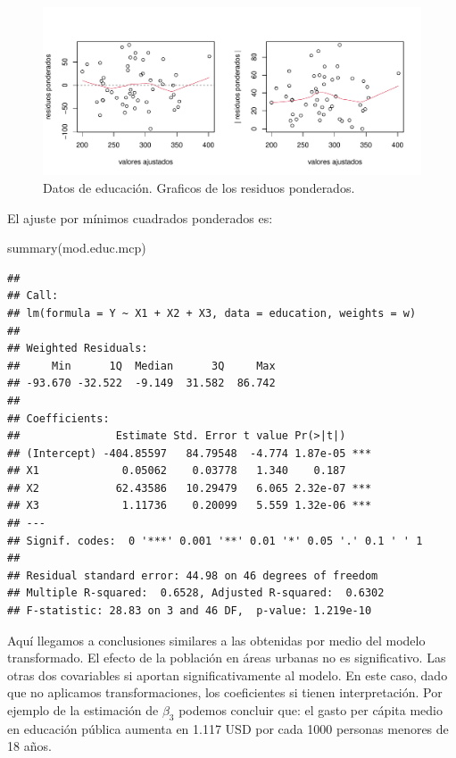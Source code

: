 \documentclass[
]{article}
\newenvironment{Shaded}{\begin{snugshade}}{\end{snugshade}}
\newcommand{\FunctionTok}[1]{\textcolor[rgb]{0.00,0.00,0.00}{#1}}
\newcommand{\NormalTok}[1]{#1}
\begin{document}
\begin{figure}

{\centering \includegraphics{MLGI_files/figure-latex/EducMCPFig-1} 

}

\caption{Datos de educación. Graficos de los residuos ponderados.}\label{fig:EducMCPFig}
\end{figure}

El ajuste por mínimos cuadrados ponderados es:

\begin{Shaded}
\begin{Highlighting}[]
\FunctionTok{summary}\NormalTok{(mod.educ.mcp)}
\end{Highlighting}
\end{Shaded}

\begin{verbatim}
## 
## Call:
## lm(formula = Y ~ X1 + X2 + X3, data = education, weights = w)
## 
## Weighted Residuals:
##     Min      1Q  Median      3Q     Max 
## -93.670 -32.522  -9.149  31.582  86.742 
## 
## Coefficients:
##               Estimate Std. Error t value Pr(>|t|)    
## (Intercept) -404.85597   84.79548  -4.774 1.87e-05 ***
## X1             0.05062    0.03778   1.340    0.187    
## X2            62.43586   10.29479   6.065 2.32e-07 ***
## X3             1.11736    0.20099   5.559 1.32e-06 ***
## ---
## Signif. codes:  0 '***' 0.001 '**' 0.01 '*' 0.05 '.' 0.1 ' ' 1
## 
## Residual standard error: 44.98 on 46 degrees of freedom
## Multiple R-squared:  0.6528, Adjusted R-squared:  0.6302 
## F-statistic: 28.83 on 3 and 46 DF,  p-value: 1.219e-10
\end{verbatim}

Aquí llegamos a conclusiones similares a las obtenidas por medio del modelo transformado. El efecto de la población en áreas urbanas no es significativo. Las otras dos covariables si aportan significativamente al modelo. En este caso, dado que no aplicamos transformaciones, los coeficientes si tienen interpretación. Por ejemplo de la estimación de \(\beta_{3}\) podemos concluir que: el gasto per cápita medio en educación pública aumenta en 1.117 USD por cada 1000 personas menores de 18 años.
\end{document}
